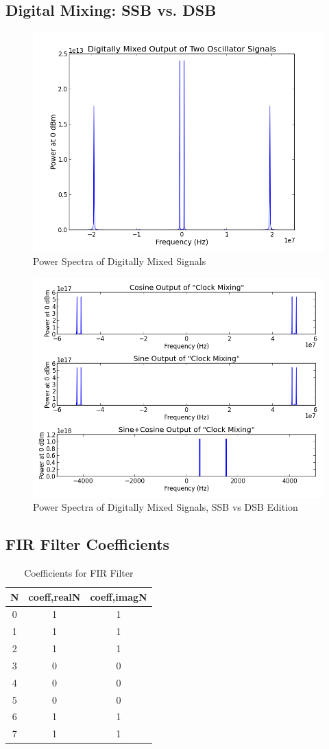 \documentclass[12pt]{article}
\begin{document}
\subsection{Digital Mixing: SSB vs. DSB}
\begin{figure}[!h]
\caption{Power Spectra of Digitally Mixed Signals}
\centering
\includegraphics[width=.75\textwidth]{roachmix.png}\end{figure}
\begin{figure}[!h]
\caption{Power Spectra of Digitally Mixed Signals, SSB vs DSB Edition}
\centering
\includegraphics[width=.75\textwidth]{roachssb.png}\end{figure}
\newpage
\subsection{FIR Filter Coefficients}
\begin{table}[!h]
\caption{Coefficients for FIR Filter}
\centering
\begin{tabular}{c c c}
\hline\hline
N & coeff,realN & coeff,imagN \\ [0.5ex]
\hline 
0 & 1 & 1 \\
1 & 1 & 1 \\
2 & 1 & 1 \\
3 & 0 & 0 \\
4 & 0 & 0 \\
5 & 0 & 0 \\
6 & 1 & 1 \\
7 & 1 & 1 \\ [1ex]
\hline
\end{tabular}
\end{table}
\newpage
\end{document}
